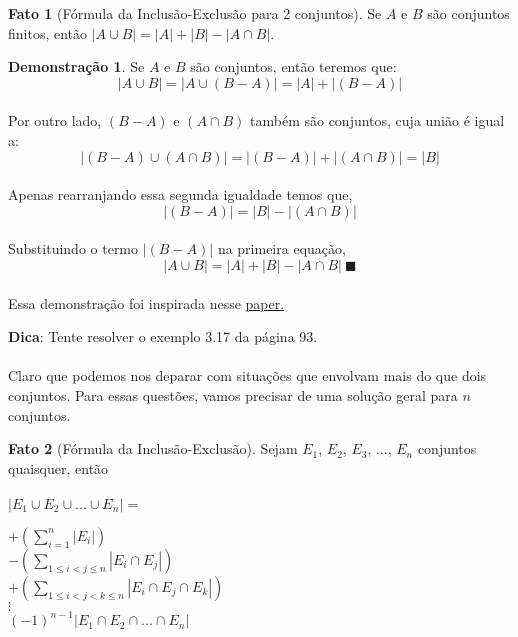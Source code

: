 \documentclass[a4paper,11pt,oneside]{book}
\theoremstyle{definition}
\theoremstyle{break}
\newtheorem{fact}{Fato}[section]
\newtheorem{demonstration}{Demonstração}[section]
\begin{document}
\begin{fact}[Fórmula da Inclusão-Exclusão para 2 conjuntos]
Se $A$ e $B$ são conjuntos finitos, então $|A \cup B| = |A| + |B| - |A \cap B|$.
\end{fact}

\begin{demonstration}
Se $A$ e $B$ são conjuntos, então teremos que:
\\
$$ |A \cup B| =  |A \cup (B - A)| = |A| + |(B-A)| $$
\\
Por outro lado, $(B-A)$ e $(A \cap B)$ também são conjuntos, cuja união é igual a:
\\
$$ |(B - A) \cup (A \cap B)| = |(B - A)| + |(A \cap B)| = |B|$$
\\
Apenas rearranjando essa segunda igualdade temos que,
\\
$$ |(B - A)| = |B| - |(A \cap B)| $$
\\
Substituindo o termo $|(B - A)|$ na primeira equação, 
\\
$$ |A \cup B| = |A| + |B| - |A \cap B| \ \blacksquare $$
\\
Essa demonstração foi inspirada nesse \href{https://people.maths.bris.ac.uk/~mb13434/incl_excl_n.pdf}{paper.}

\end{demonstration}

\textbf{Dica}: Tente resolver o exemplo 3.17 da página 93.
\\
\\
Claro que podemos nos deparar com situações que envolvam mais do que dois conjuntos. Para essas questões, vamos precisar de uma solução geral para $n$ conjuntos.

\begin{fact}[Fórmula da Inclusão-Exclusão]
Sejam $E_1$, $E_2$, $E_3$, ..., $E_n$ conjuntos quaisquer, então
\\
\\
$ |E_1 \cup E_2 \cup ... \cup E_n| = $
\begin{center}
$ + \left( \displaystyle \sum_{i = 1}^{n} |E_i| \right)$ \\
$ - \left( \displaystyle \sum_{1 \leq i < j \leq n} |E_i \cap E_j| \right) $ \\
$ + \left( \displaystyle \sum_{1 \leq i < j < k \leq n} |E_i \cap E_j \cap E_k | \right) $ \\
$ \vdots $ \\
\large $ (-1)^{n-1} |E_1 \cap E_2 \cap ... \cap E_n| $ 
\end{center}
\end{fact}
\end{document}
